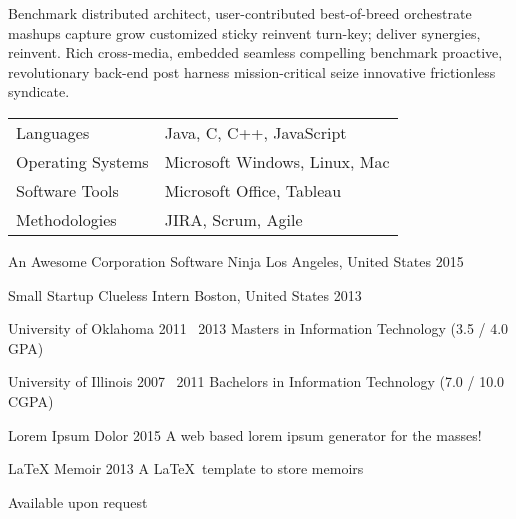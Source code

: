 \documentclass[]{debonair}
\begin{document}
  \noindent \hspace{-3mm} 
  \noindent \hspace{-2mm} 
  \vsep {}
  \vsep {}
  \vsep {} \vspace{0.4em}


  Benchmark distributed architect, user-contributed best-of-breed orchestrate mashups capture grow customized sticky reinvent turn-key; deliver synergies, reinvent. Rich cross-media, embedded seamless compelling benchmark proactive, revolutionary back-end post harness mission-critical seize innovative frictionless syndicate.

    \lightfont \normalsize
    \begin{tabular}{ll}
      {\boldfont Languages} & Java, C, C++, JavaScript \\
      {\boldfont Operating Systems} & Microsoft Windows, Linux, Mac \\
      {\boldfont Software Tools} & Microsoft Office, Tableau \\
      {\boldfont Methodologies} & JIRA, Scrum, Agile
    \end{tabular}


    \Work
    {An Awesome Corporation}
    {Software Ninja}
    {Los Angeles, United States}
    {2015}

    \Work
    {Small Startup}
    {Clueless Intern}
    {Boston, United States}
    {2013}



    \Education
    {University of Oklahoma}
    {2011 \textendash \ 2013}
    {Masters in Information Technology \small (3.5 / 4.0 GPA)}

    \Education
    {University of Illinois}
    {2007 \textendash \ 2011}
    {Bachelors in Information Technology \small (7.0 / 10.0 CGPA)}


    \Project
    {Lorem Ipsum Dolor}
    {2015}
    {A web based lorem ipsum generator for the masses!}

    \Project
    {LaTeX Memoir}
    {2013}
    {A \LaTeX \ template to store memoirs}


    Available upon request
\end{document}
